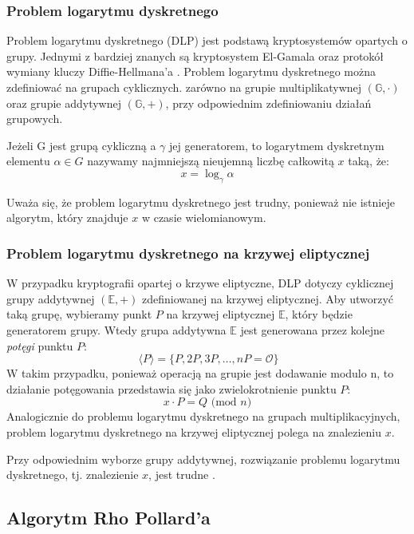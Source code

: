 \subsubsection{Problem logarytmu dyskretnego}
Problem logarytmu dyskretnego (DLP) jest
podstawą kryptosystemów opartych o grupy.
Jednymi z bardziej znanych są kryptosystem El-Gamala oraz protokół wymiany
kluczy Diffie-Hellmana'a \cite[text]{Stinson2021,Blake2005}.
Problem logarytmu dyskretnego można zdefiniować na grupach cyklicznych.
zarówno na grupie multiplikatywnej $(\mathbb{G},\cdot)$
oraz grupie addytywnej $(\mathbb{G}, +)$, przy odpowiednim zdefiniowaniu działań grupowych.

Jeżeli G jest grupą cykliczną a $\gamma$ jej generatorem, to logarytmem dyskretnym
elementu $\alpha \in G$ nazywamy najmniejszą nieujemną liczbę całkowitą $x$ taką, że:
\[x = \log_{\gamma}{\alpha}\]

Uważa się, że problem logarytmu dyskretnego jest trudny, ponieważ nie istnieje
algorytm, który znajduje $x$ w czasie wielomianowym\cite{Stinson2021}.


\subsubsection{Problem logarytmu dyskretnego na krzywej eliptycznej}
W przypadku kryptografii opartej o krzywe eliptyczne, DLP dotyczy cyklicznej \\
grupy addytywnej $(\mathbb{E},+)$ zdefiniowanej na krzywej eliptycznej.
Aby utworzyć taką grupę, wybieramy punkt $P$ na krzywej eliptycznej $\mathbb{E}$,
który będzie generatorem grupy. Wtedy grupa addytywna $\mathbb{E}$ jest generowana przez
kolejne \textit{potęgi} punktu $P$:
\[\ \langle P \rangle = \{P, 2P, 3P, \ldots, nP = \mathcal{O}\}\]
W takim przypadku, ponieważ operacją na grupie jest dodawanie modulo n, to działanie
potęgowania przedstawia się jako zwielokrotnienie punktu $P$:
\[x \cdot P = Q \textrm{ (mod } n)\]
Analogicznie do problemu logarytmu dyskretnego na grupach multiplikacyjnych,
problem logarytmu dyskretnego na krzywej eliptycznej polega na znalezieniu
$x$.
\par
Przy odpowiednim wyborze grupy addytywnej, rozwiązanie problemu logarytmu dyskretnego,
tj. znalezienie $x$,
jest trudne \cite{Stinson2021}.


\subsection{Algorytm Rho Pollard'a}


